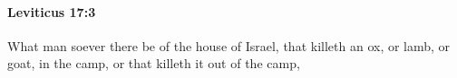 
		\paragraph{Leviticus 17:3} %
			\label{LEVITICUS-17-3}

			What man soever there be of the house of Israel, that killeth an ox, or lamb, or goat, in the camp, or that killeth it out of the camp,


